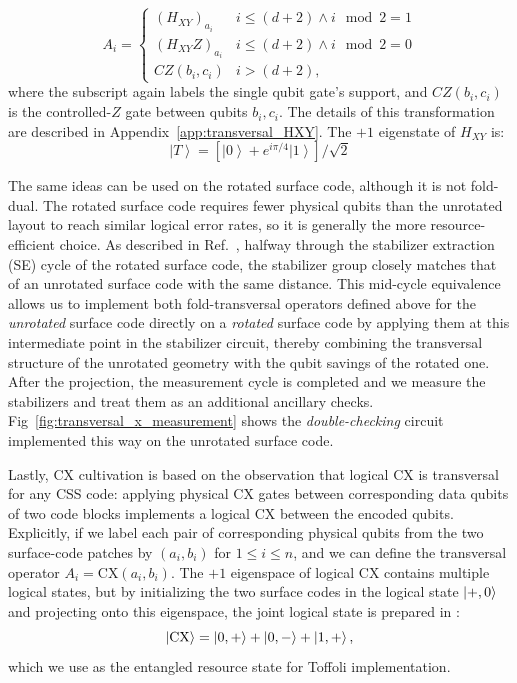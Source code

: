 \documentclass[twocolumn,notitlepage,nofootinbib,floatfix,superscriptaddress]{revtex4-1}
\begin{document}
$$
A_{i}=\begin{cases}
\left(H_{XY}\right)_{a_{i}} & i\le\left(d+2\right)\land i\mod2=1\\
\left(H_{XY}Z\right)_{a_{i}} & i\le\left(d+2\right)\land i\mod2=0\\
CZ\left(b_{i},c_{i}\right) & i>\left(d+2\right),
\end{cases}
$$
where the subscript again labels the single qubit gate's support, and $CZ(b_i,c_i)$ is the controlled-$Z$ gate between qubits $b_i, c_i$. The details of this transformation are described in Appendix~\ref{app:transversal_HXY}. The $+1$ eigenstate of $H_{XY}$ is:
$$
\left|T\right>=\left[\left|0\right>+e^{i\pi/4}\left|1\right>\right]/\sqrt{2}
$$

The same ideas can be used on the rotated surface code, although it is not fold-dual. The rotated surface code requires fewer physical qubits than the unrotated layout to reach similar logical error rates, so it is generally the more resource-efficient choice. As described in Ref.~\cite{chen2024transversal}, halfway through the stabilizer extraction (SE) cycle of the rotated surface code, the stabilizer group closely matches that of an unrotated surface code with the same distance. This mid-cycle equivalence allows us to implement both fold-transversal operators defined above for the \emph{unrotated} surface code directly on a \emph{rotated} surface code by applying them at this intermediate point in the stabilizer circuit, thereby combining the transversal structure of the unrotated geometry with the qubit savings of the rotated one. After the projection, the measurement cycle is completed and we measure the stabilizers and treat them as an additional ancillary checks. Fig~\ref{fig:transversal_x_measurement} shows the \textit{double-checking} circuit implemented this way on the unrotated surface code. 

Lastly, CX cultivation is based on the observation that logical $\mathrm{CX}$ is transversal for any CSS code: applying physical $\mathrm{CX}$ gates between corresponding data qubits of two code blocks implements a logical $\mathrm{CX}$ between the encoded qubits. Explicitly, if we label each pair of corresponding physical qubits from the two surface-code patches by $(a_i,b_i)$ for $1 \le i \le n$, and we can define the transversal operator $A_i = \mathrm{CX}(a_i,b_i)$. The $+1$ eigenspace of logical $\mathrm{CX}$ contains multiple logical states, but by initializing the two surface codes in the logical state $\ket{+,0}$ and projecting onto this eigenspace, the joint logical state is prepared in :
\[
    \ket{\mathrm{CX}} = \ket{0,+} + \ket{0,-} + \ket{1,+},
\]
which we use as the entangled resource state for Toffoli implementation\cite{dennis2001toward, gupta2024encoding}.
\end{document}
